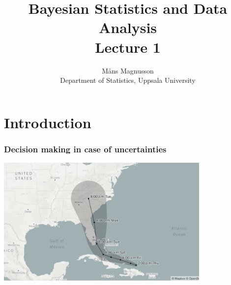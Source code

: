 \documentclass[10pt,handout]{beamer}
\title[]{{\color{black}Bayesian Statistics and Data Analysis \\ Lecture 1}}
\author[]{M{\aa}ns Magnusson \\ Department of Statistics, Uppsala University}
\date{}
\begin{document}
\frame{\titlepage
}



\section{Introduction}
\frame{\sectionpage}

\begin{frame}

  \frametitle{Decision making in case of uncertainties}

  \begin{center}
    \includegraphics[width=10.5cm]{figs/irma.png}
  \end{center}
\end{frame}
\end{document}
